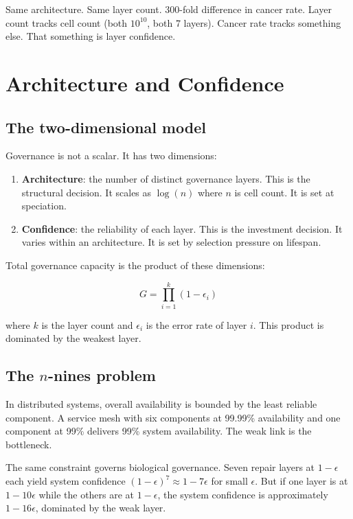 \documentclass[11pt]{article}
\theoremstyle{definition}
\begin{document}
Same architecture. Same layer count. 300-fold difference in cancer
rate. Layer count tracks cell count (both $10^{10}$, both 7 layers).
Cancer rate tracks something else. That something is layer confidence.

\section{Architecture and Confidence}
\label{sec:confidence}

\subsection{The two-dimensional model}

Governance is not a scalar. It has two dimensions:

\begin{enumerate}
\item \textbf{Architecture}: the number of distinct governance layers.
   This is the structural decision. It scales as $\log(n)$ where $n$
   is cell count. It is set at speciation.
\item \textbf{Confidence}: the reliability of each layer. This is
   the investment decision. It varies within an architecture. It is
   set by selection pressure on lifespan.
\end{enumerate}

Total governance capacity is the product of these dimensions:

\[
G = \prod_{i=1}^{k} (1 - \epsilon_i)
\]

where $k$ is the layer count and $\epsilon_i$ is the error rate of
layer $i$. This product is dominated by the weakest layer.

\subsection{The $n$-nines problem}

In distributed systems, overall availability is bounded by the least
reliable component. A service mesh with six components at 99.99\%
availability and one component at 99\% delivers 99\% system
availability. The weak link is the bottleneck.

The same constraint governs biological governance. Seven repair layers
at $1 - \epsilon$ each yield system confidence
$(1-\epsilon)^7 \approx 1 - 7\epsilon$ for small $\epsilon$. But if
one layer is at $1 - 10\epsilon$ while the others are at
$1 - \epsilon$, the system confidence is approximately
$1 - 16\epsilon$, dominated by the weak layer.
\end{document}
